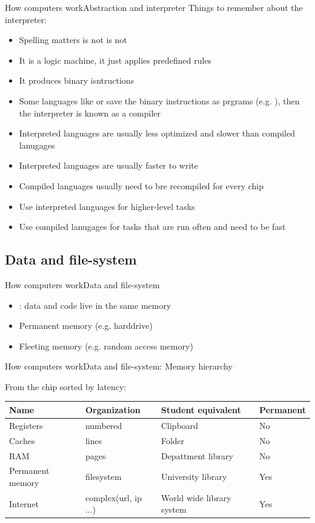 \documentclass[aspectratio=169]{beamer}
\begin{document}
\begin{frame}{How computers work}{Abstraction and interpreter}
Things to remember about the interpreter:
\begin{itemize}
	\item Spelling matters  is not  is not 
	\item It is a logic machine, it just applies predefined rules
	\item It produces binary isntructions
	\item Some languages like  or  save the binary instructions as prgrams (e.g. ),
		then the interpreter is known as a compiler
	\item Interpreted languages are usually less optimized and slower than compiled lanugages
	\item Interpreted languages are usually faster to write
	\item Compiled languages usually need to bre recompiled for every chip
	\item Use interpreted languages for higher-level tasks
	\item Use compiled lanugages for tasks that are run often and need to be fast
\end{itemize}
\end{frame}

\subsection{Data and file-system}
\begin{frame}{How computers work}{Data and file-system}
\begin{itemize}
	\item {}: data and code live in the same memory
	\item Permanent memory (e.g. harddrive)
	\item Fleeting memory (e.g. random access memory)
\end{itemize}
\end{frame}

\begin{frame}{How computers work}{Data and file-system: Memory hierarchy}

From the chip sorted by latency:

\vspace{2em}

\begin{tabular}{llll}
	\toprule
	Name & Organization & Student equivalent & Permanent \\
	\midrule
	Registers & numbered & Clipboard & No\\
	Caches & lines & Folder & No \\
	RAM & pages & Depattment library & No \\
	Permanent memory & filesystem & University library & Yes \\
	Internet & complex(url, ip ...) & World wide library system & Yes \\
	\bottomrule
\end{tabular}
\end{frame}
\end{document}
